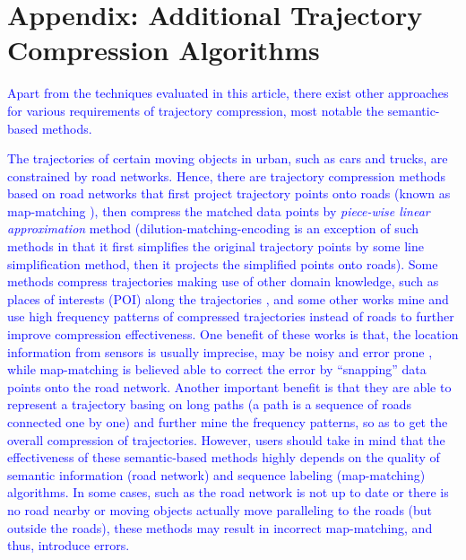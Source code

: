 \section*{{Appendix: Additional Trajectory Compression Algorithms}}
\textcolor{blue}{Apart from the techniques evaluated in this article, there exist other approaches for various requirements of trajectory compression, most notable the semantic-based methods.}

\textcolor{blue}{The trajectories of certain moving objects in urban, such as cars and trucks, are constrained by road networks. Hence, there are trajectory compression methods based on road networks \cite{Chen:Trajectory, Popa:Spatio,Civilis:Techniques,Hung:Clustering, Kellaris:Map, Song:PRESS, Han:Compress, Cao:Road} that first project trajectory points onto roads (known as map-matching \cite{Quddus:MapMatching}), then compress the matched data points by \emph{piece-wise linear approximation} method \cite{Elmeleegy:Stream, Xie:Stream,Luo:Streaming,ORourke:Fitting} (dilution-matching-encoding \cite{Gotsman:Compaction} is an exception of such methods in that it first simplifies the original trajectory points by some line simplification method, then it projects the simplified points onto roads).}
%
\textcolor{blue}{Some methods \cite{Schmid:Semantic, Richter:Semantic} compress trajectories making use of other domain knowledge, such as places of interests (POI) along the trajectories \cite{Richter:Semantic}, and some other works \cite{Gotsman:Compaction, Song:PRESS, Han:Compress,Koide:CiNCT} mine and use high frequency patterns of compressed trajectories instead of roads to further improve compression effectiveness.}
%
\textcolor{blue}{One benefit of these works is that, the location information from sensors is usually imprecise, may be noisy and error prone \cite{Cao:Road}, while map-matching is believed able to correct the error by “snapping” data points onto the road network.
Another important benefit is that they are able to represent a trajectory basing on long paths (a path is a sequence of roads connected one by one) and further mine the frequency patterns, so as to get the overall compression of trajectories.} 
%
\textcolor{blue}{However, users should take in mind that the effectiveness of these semantic-based methods highly depends on the quality of semantic information (\eg road network) and sequence labeling (\eg map-matching) algorithms. In some cases, such as the road network is not up to date or there is no road nearby or moving objects actually move paralleling to the roads (but outside the roads), these methods may result in incorrect map-matching, and thus, introduce errors.}

